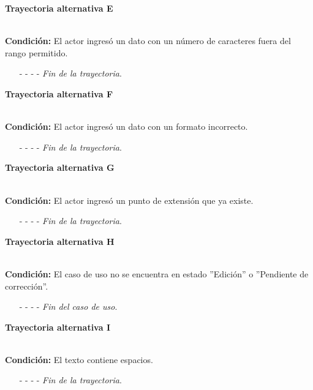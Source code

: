 \hypertarget{CU12-1-6-2:TAE}{\textbf{Trayectoria alternativa E}}\\
\noindent \textbf{Condición:} El actor ingresó un dato con un número de caracteres fuera del rango permitido.
\begin{enumerate}
	\UCpaso[\UCsist] Muestra el mensaje  señalando el campo que presenta el error en la pantalla .
	\UCpaso Regresa al paso \ref{CU12.1.6.2-P4} de la trayectoria principal.
	\item[- -] - - {\em {Fin de la trayectoria}}.%
\end{enumerate}
\hypertarget{CU12-1-6-2:TAF}{\textbf{Trayectoria alternativa F}}\\
\noindent \textbf{Condición:} El actor ingresó un dato con un formato incorrecto.
\begin{enumerate}
	\UCpaso[\UCsist] Muestra el mensaje  señalando el campo que presenta el error en la pantalla .
	\UCpaso Regresa al paso \ref{CU12.1.6.2-P4} de la trayectoria principal.
	\item[- -] - - {\em {Fin de la trayectoria}}.
\end{enumerate}
\hypertarget{CU12-1-6-2:TAG}{\textbf{Trayectoria alternativa G}}\\
\noindent \textbf{Condición:} El actor ingresó un punto de extensión que ya existe.
\begin{enumerate}
	\UCpaso[\UCsist] Muestra el mensaje  señalando el campo que presenta la duplicidad en la pantalla .
	\UCpaso Regresa al paso \ref{CU12.1.6.2-P4} de la trayectoria principal.
	\item[- -] - - {\em {Fin de la trayectoria}}.
\end{enumerate}
\hypertarget{CU12-1-6-2:TAH}{\textbf{Trayectoria alternativa H}}\\
\noindent \textbf{Condición:} El caso de uso no se encuentra en estado ''Edición'' o ''Pendiente de corrección''.
\begin{enumerate}
	\UCpaso[\UCsist]  Oculta el botón  del caso que no se encuentra en estado de ''Edición'' o ''Pendiente de corrección''.
	\item[- -] - - {\em {Fin del caso de uso}}.
\end{enumerate}
\hypertarget{CU12-1-6-2:TAI}{\textbf{Trayectoria alternativa I}}\\
\noindent \textbf{Condición:} El texto contiene espacios.
\begin{enumerate}
	\UCpaso[\UCsist] Sustituye los espacios por guiones bajos.
	\UCpaso Continua en el paso \ref{CU12.1.6.2-TA6} de la trayectoria alternativa A.
	\item[- -] - - {\em {Fin de la trayectoria}}.
\end{enumerate}
